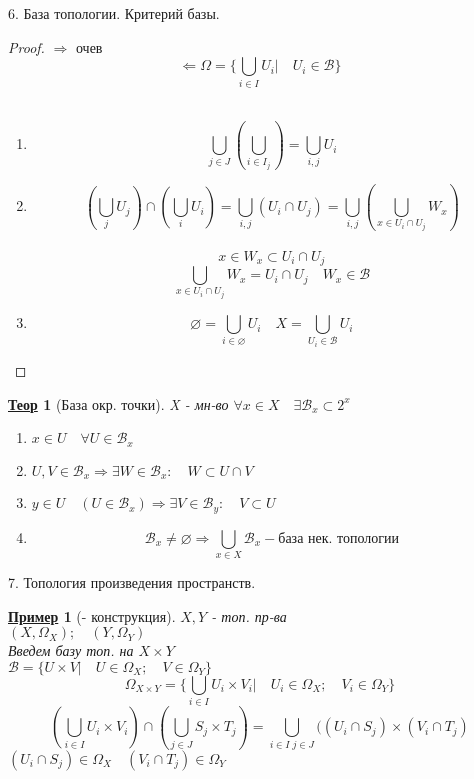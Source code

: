 \documentclass[12pt, fleqn]{article}
\newenvironment{question}[1]{\hspace*{-4em} #1}{\newpage}
\newcommand{\B}{\mathcal{B}}
\newcommand{\ra}{\Rightarrow}
\newcommand{\la}{\Leftarrow}
\newcommand{\q}{\quad}
\newcommand\setItemnumber[1]{\setcounter{enumi}{\numexpr#1-1\relax}}
\theoremstyle{nonumbermarginbreak}
\newtheorem{theorem}{\hspace*{-2em}\underline{\bfseries Теор}}[section]
\newtheorem{example}{\hspace*{-2em}\underline{\bfseries Пример}}[section]
\newtheorem{proof}{\hspace*{-2em}\underline{\bfseries Док-во}}[section]
\begin{document}
\begin{question}{6. База топологии. Критерий базы.}
        \begin{proof} 
            $\ra$ очев\\
            \[\la \Omega = \{\bigcup_{i \in I} U_i | \quad U_i \in \B\}\]\\
            \begin{enumerate}
                \item \[\bigcup_{j \in J}(\bigcup_{i \in I_j}) = \bigcup_{i, j} U_i \]
                \item \[(\bigcup_j U_j) \cap (\bigcup_i U_i)  =  \bigcup_{i, j} (U_i \cap U_j) = 
                \bigcup_{i, j} (\bigcup_{x \in U_i \cap U_j} W_x)\]\\
                \[x \in W_x \subset U_i \cap U_j\]
                \[\bigcup_{x \in U_i \cap U_j} W_x = U_i \cap U_j \q W_x \in \B\]
                \item \[\varnothing = \bigcup_{i \in \varnothing} U_i \q X = \bigcup_{U_i \in \B} U_i\]
            \end{enumerate}
        \end{proof}

        \begin{theorem} [База окр. точки]
                X - мн-во $\forall x \in X \q \exists \B_x \subset 2^x$
                \begin{enumerate}
                    \item $x \in U \q \forall U \in \B_x$
                    \item $U, V \in \B_x \ra \exists W \in \B_x: \q W \subset U \cap V$
                    \item $y \in U \q(U \in \B_x) \ra \exists V \in \B_y: \q V \subset U$
                    \setItemnumber{0}
                    \item \[\B_x \neq \varnothing \ra \bigcup_{x \in X} \B_x - \text{база нек. топологии}\] 
                \end{enumerate}
        \end{theorem}
    \end{question}

    \begin{question}{7. Топология произведения пространств.}
        \begin{example} [- конструкция]
            $X, Y$ - топ. пр-ва\\
            $(X, \Omega_X); \q (Y, \Omega_Y)$ \\
            Введем базу топ. на $X \times Y$\\
            $\B = \{U \times V | \q U \in \Omega_X; \q V \in \Omega_Y\}$\\
            \[\Omega_{X \times Y} = \{\bigcup_{i \in I} U_i \times V_i | \q U_i \in \Omega_X; \q V_i \in \Omega_Y\}\]
            \[(\bigcup_{i \in I} U_i \times V_i) \cap (\bigcup_{j \in J} S_j \times T_j) = 
            \bigcup_{i \in I \; j  \in J} ((U_i \cap S_j) \times (V_i \cap T_j)\]
            $(U_i \cap S_j) \in \Omega_X \q (V_i \cap T_j) \in \Omega_Y$
        \end{example}
    \end{question}
\end{document}
